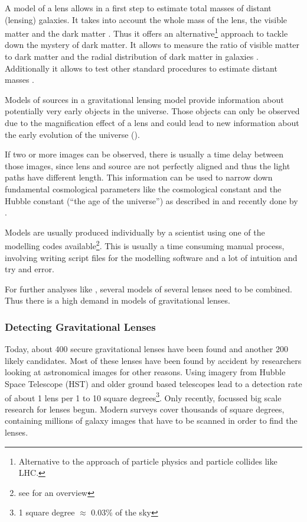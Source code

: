 \documentclass[11pt]{article}
\begin{document}
A model of a lens allows in a first step to estimate total masses of distant (lensing) galaxies.
It takes into account the whole mass of the lens, the visible matter and the dark matter \cite{kochanek1995there}.
Thus it offers an alternative\footnote{Alternative to the approach of particle physics and particle collides like LHC.} approach to tackle down the mystery of dark matter.
It allows to measure the ratio of visible matter to dark matter and the radial distribution of dark matter in galaxies \cite{treukoop04}.
Additionally it allows to test other standard procedures to estimate distant masses \cite{kochanek1995there}.

Models of sources in a gravitational lensing model provide information about potentially very early objects in the universe.
Those objects can only be observed due to the magnification effect of a lens and could lead to new information about the early evolution of the universe (\cite{rusin03}).

If two or more images can be observed, there is usually a time delay between those images, since lens and source are not perfectly aligned and thus the light paths have different length.
This information can be used to narrow down fundamental cosmological parameters like the cosmological constant and the Hubble constant (``the age of the universe'') as described in \cite{refsdal1964} and recently done by \cite{age_uni}.


Models are usually produced individually by a scientist using one of the modelling codes available\footnote{see \cite{overview_soft2013} for an overview}.
This is usually a time consuming manual process, involving writing script files for the modelling software and a lot of intuition and try and error.

For further analyses like \cite{age_uni}, several models of several lenses need to be combined.
Thus there is a high demand in models of gravitational lenses.




\subsubsection{Detecting Gravitational Lenses}

Today, about 400 secure gravitational lenses have been found and another 200 likely candidates.
Most of these lenses have been found by accident by researchers looking at astronomical images for other reasons.
Using imagery from Hubble Space Telescope (HST) and older ground based telescopes lead to a detection rate of about 1 lens per 1 to 10 square degrees\footnote{1 square degree $\approx$ 0.03\% of the sky}.
Only recently, focussed big scale research for lenses begun.
Modern surveys cover thousands of square degrees, containing millions of galaxy images that have to be scanned in order to find the lenses.
\end{document}
